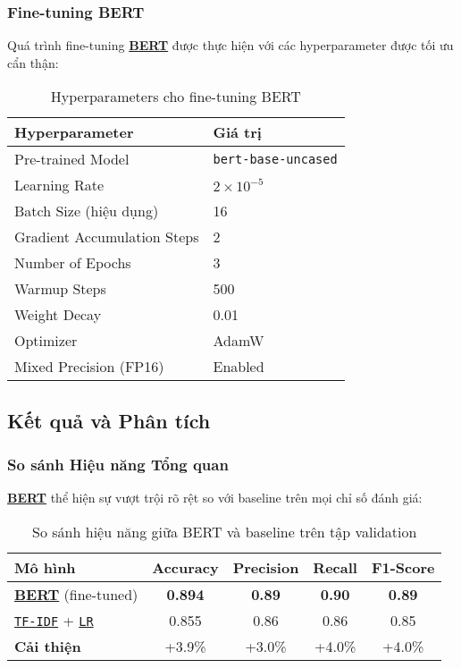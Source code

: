 \subsubsection{Fine-tuning BERT}

Quá trình fine-tuning \hyperref[acro:bert]{\textbf{BERT}} được thực hiện với các hyperparameter được tối ưu cẩn thận:

\begin{table}[H]
\centering
\caption{Hyperparameters cho fine-tuning BERT}
\label{tab:bert_hyperparams}
\begin{tabular}{ll}
\toprule
\textbf{Hyperparameter} & \textbf{Giá trị} \\
\midrule
Pre-trained Model & \texttt{bert-base-uncased} \\
Learning Rate & $2 \times 10^{-5}$ \\
Batch Size (hiệu dụng) & 16 \\
Gradient Accumulation Steps & 2 \\
Number of Epochs & 3 \\
Warmup Steps & 500 \\
Weight Decay & 0.01 \\
Optimizer & AdamW \cite{loshchilov2017decoupled} \\
Mixed Precision (FP16) & Enabled \\
\bottomrule
\end{tabular}
\end{table}

\subsection{Kết quả và Phân tích}
\label{ssec:ket_qua_phan_tich}

\subsubsection{So sánh Hiệu năng Tổng quan}

\hyperref[acro:bert]{\textbf{BERT}} thể hiện sự vượt trội rõ rệt so với baseline trên mọi chỉ số đánh giá:

\begin{table}[H]
\centering
\caption{So sánh hiệu năng giữa BERT và baseline trên tập validation}
\label{tab:performance_comparison}
\begin{tabular}{lcccc}
\toprule
\textbf{Mô hình} & \textbf{Accuracy} & \textbf{Precision} & \textbf{Recall} & \textbf{F1-Score} \\
\midrule
\hyperref[acro:bert]{\textbf{BERT}} (fine-tuned) & \textbf{0.894} & \textbf{0.89} & \textbf{0.90} & \textbf{0.89} \\
\hyperref[acro:tfidf]{\texttt{TF-IDF}} + \hyperref[acro:lr]{\texttt{LR}} & 0.855 & 0.86 & 0.86 & 0.85 \\
\midrule
\textbf{Cải thiện} & +3.9\% & +3.0\% & +4.0\% & +4.0\% \\
\bottomrule
\end{tabular}
\end{table}

